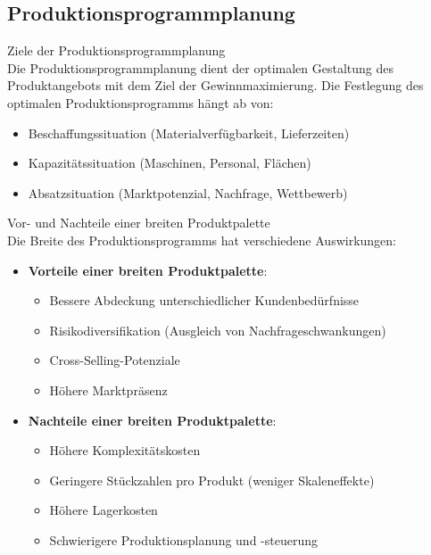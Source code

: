 
\subsection{Produktionsprogrammplanung}

\begin{definition}{Ziele der Produktionsprogrammplanung}\\
Die Produktionsprogrammplanung dient der optimalen Gestaltung des Produktangebots mit dem Ziel der Gewinnmaximierung. Die Festlegung des optimalen Produktionsprogramms hängt ab von:
\begin{itemize}
    \item Beschaffungssituation (Materialverfügbarkeit, Lieferzeiten)
    \item Kapazitätssituation (Maschinen, Personal, Flächen)
    \item Absatzsituation (Marktpotenzial, Nachfrage, Wettbewerb)
\end{itemize}
\end{definition}

\begin{concept}{Vor- und Nachteile einer breiten Produktpalette}\\
Die Breite des Produktionsprogramms hat verschiedene Auswirkungen:
\begin{itemize}
    \item \textbf{Vorteile einer breiten Produktpalette}:
    \begin{itemize}
        \item Bessere Abdeckung unterschiedlicher Kundenbedürfnisse
        \item Risikodiversifikation (Ausgleich von Nachfrageschwankungen)
        \item Cross-Selling-Potenziale
        \item Höhere Marktpräsenz
    \end{itemize}
    \item \textbf{Nachteile einer breiten Produktpalette}:
    \begin{itemize}
        \item Höhere Komplexitätskosten
        \item Geringere Stückzahlen pro Produkt (weniger Skaleneffekte)
        \item Höhere Lagerkosten
        \item Schwierigere Produktionsplanung und -steuerung
    \end{itemize}
\end{itemize}
\end{concept}

